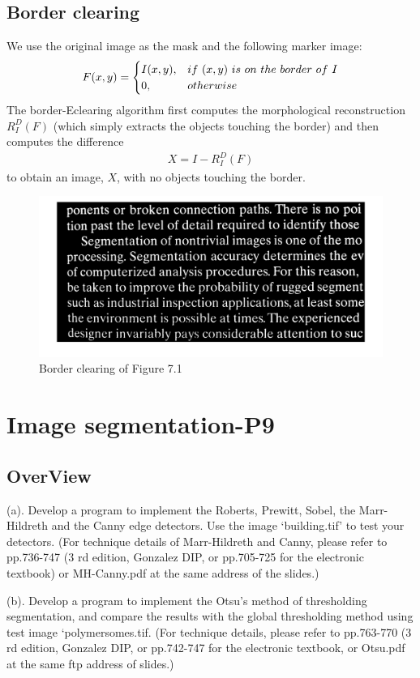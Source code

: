 \documentclass[11pt,oneside]{book}
\begin{document}
\section{Border clearing}
We use the original image as the mask and the following marker image:
\begin{eqnarray}F(x,y)=
\begin{cases}
I(x,y), &if\ (x, y)\ is\ on\ the\ border\ of\ I \cr 0,&otherwise\end{cases}
\end{eqnarray}
The border-Eclearing algorithm first computes the morphological reconstruction $R_I^D(F)$ (which simply extracts the objects touching the border) and then computes the difference
\begin{align}
  X=I-R_I^D(F)
\end{align}
to obtain an image, $X$, with no objects touching the border.
\begin{figure}[!htb]
   \centering  
   \includegraphics[width=1\textwidth]{images/8/image_3.jpg}
   \caption{Border clearing of Figure 7.1}
\end{figure}

\chapter{Image segmentation-P9}
\section{OverView}
(a). Develop a program to implement the Roberts, Prewitt, Sobel, the Marr-Hildreth and the Canny edge detectors. Use the image ‘building.tif’ to test your detectors. (For technique details of Marr-Hildreth and Canny, please refer to pp.736-747 (3 rd edition, Gonzalez DIP, or pp.705-725 for the electronic textbook) or MH-Canny.pdf at the same address of the slides.)

(b). Develop a program to implement the Otsu’s method of thresholding segmentation, and compare the results with the global thresholding method using test image ‘polymersomes.tif. (For technique details, please refer to pp.763-770 (3 rd edition, Gonzalez DIP, or pp.742-747 for the electronic textbook, or Otsu.pdf at the same ftp address of slides.)
\end{document}
